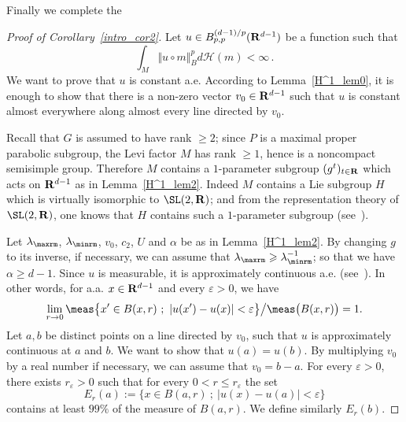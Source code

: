 Finally we complete the 
\begin{proof}[Proof of Corollary~\ref{intro_cor2}]
Let $u \in B_{p,p} ^{(d-1)/p} ({\bf R} ^{d-1})$ be a function such that
\[
\int _M \!\Vert u \circ m \Vert _B ^p d\mathcal H (m) < \infty\,. 
\]
We want to prove that $u$ is constant a.e. According to Lemma~\ref{H^1_lem0}, it is enough to show that there is a non-zero vector $v_0 \in {\bf R}^{d-1}$ such that $u$ is constant almost everywhere along almost every line directed by $v_0$.

Recall that $G$ is assumed to have rank $\geqslant 2$; since $P$ is a maximal proper parabolic subgroup, the Levi factor $M$ has rank $\geqslant 1$, hence is a noncompact semisimple group. Therefore $M$ contains a $1$-parameter subgroup $(g^t)_{t \in {\bf R}}$ which acts on ${\bf R} ^{d-1}$ as in Lemma~\ref{H^1_lem2}. Indeed $M$ contains a Lie subgroup $H$ which is virtually isomorphic to $\SL(2, \bf R)$; and from the representation theory of $\SL(2, \bf R)$, one knows that $H$ contains such a $1$-parameter subgroup (see~\cite[Corollary~7.2]{Humphreys-LA}).

Let $\lambda _{\maxrm}$, $\lambda _{\minrm}$, $v_0$, $c_2$, $U$ and $\alpha$ be as in Lemma~\ref{H^1_lem2}. By changing $g$ to its inverse, if necessary, we can assume that $\lambda _{\maxrm} \geqslant \lambda _{\minrm}^{-1}$; so that we have $\alpha \geqslant d-1$. Since $u$ is measurable, it is approximately continuous a.e. (see~\cite[2.9.13]{Fed}). In other words, for a.a. $x \in {\bf R} ^{d-1}$ and every $\varepsilon >0$, we have
\[
\lim _{r \to 0} \meas\bigl\{x' \in B(x,r)~;~\vert u(x') - u(x) \vert < \varepsilon \bigr\} \big/ \meas\bigl(B(x,r)\bigr) =1.
\]
Let $a, b$ be distinct points on a line directed by $v_0$, such that $u$ is approximately continuous at $a$ and $b$. We want to show that $u(a) = u(b)$. By multiplying $v_0$ by a real number if necessary, we can assume that $v_0 = b-a$. For every $\varepsilon > 0$, there exists $r_\varepsilon >0$ such that for every $0<r \leqslant r_\varepsilon$ the set
\[
E_r (a) := \bigl\{x \in B(a,r)~;~\vert u(x) - u(a) \vert < \varepsilon \bigr\}
\]
contains at least $99 \%$ of the measure of $B(a,r)$.
We define similarly $E_r (b)$.


\end{proof}
